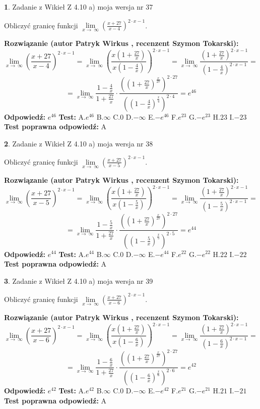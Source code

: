 \documentclass[12pt, a4paper]{article}
\theoremstyle{definition} %
\newtheorem{zad}{}
\newcommand{\zadStart}[1]{\begin{zad}#1\newline}
\newcommand{\zadStop}{\end{zad}}
\newcommand{\rozwStart}[2]{\noindent \textbf{Rozwiązanie (autor #1 , recenzent #2): }\newline}
\newcommand{\rozwStop}{\newline}
\newcommand{\odpStart}{\noindent \textbf{Odpowiedź:}\newline}
\newcommand{\odpStop}{\newline}
\newcommand{\testStart}{\noindent \textbf{Test:}\newline}
\newcommand{\testStop}{\newline}
\newcommand{\kluczStart}{\noindent \textbf{Test poprawna odpowiedź:}\newline}
\newcommand{\kluczStop}{\newline}
\begin{document}
\zadStart{Zadanie z Wikieł Z 4.10 a) moja wersja nr 37}

Obliczyć granicę funkcji  $\lim\limits_{x\to\ \infty}(\frac{x+27}{x-4})^{2\cdot x-1}$.
\zadStop
\rozwStart{Patryk Wirkus}{Szymon Tokarski}
$$\lim\limits_{x\to\ \infty}(\frac{x+27}{x-4})^{2\cdot x-1} = \lim\limits_{x\to\ \infty}(\frac{x(1+\frac{27}{x})}{x(1-\frac{4}{x})})^{2\cdot x-1}=\lim\limits_{x\to\ \infty}\frac{(1+\frac{27}{x})^{2\cdot x-1}}{(1-\frac{4}{x})^{2\cdot x-1}}=$$
$$=\lim\limits_{x\to\ \infty}\frac{1-\frac{4}{x}}{1+\frac{27}{x}}\cdot\frac{((1+\frac{27}{x})^{\frac{x}{27}})^{2\cdot27}}{((1-\frac{4}{x})^{\frac{x}{4}})^{2\cdot4}}=e^{46}$$
\rozwStop
\odpStart
$e^{46}$
\odpStop
\testStart
A.$e^{46}$ B.$\infty$ C.$0$ D.$-\infty$ E.$-e^{46}$
F.$e^{23}$ G.$-e^{23}$
H.$23$
I.$-23$
\testStop
\kluczStart
A
\kluczStop



\zadStart{Zadanie z Wikieł Z 4.10 a) moja wersja nr 38}

Obliczyć granicę funkcji  $\lim\limits_{x\to\ \infty}(\frac{x+27}{x-5})^{2\cdot x-1}$.
\zadStop
\rozwStart{Patryk Wirkus}{Szymon Tokarski}
$$\lim\limits_{x\to\ \infty}(\frac{x+27}{x-5})^{2\cdot x-1} = \lim\limits_{x\to\ \infty}(\frac{x(1+\frac{27}{x})}{x(1-\frac{5}{x})})^{2\cdot x-1}=\lim\limits_{x\to\ \infty}\frac{(1+\frac{27}{x})^{2\cdot x-1}}{(1-\frac{5}{x})^{2\cdot x-1}}=$$
$$=\lim\limits_{x\to\ \infty}\frac{1-\frac{5}{x}}{1+\frac{27}{x}}\cdot\frac{((1+\frac{27}{x})^{\frac{x}{27}})^{2\cdot27}}{((1-\frac{5}{x})^{\frac{x}{5}})^{2\cdot5}}=e^{44}$$
\rozwStop
\odpStart
$e^{44}$
\odpStop
\testStart
A.$e^{44}$ B.$\infty$ C.$0$ D.$-\infty$ E.$-e^{44}$
F.$e^{22}$ G.$-e^{22}$
H.$22$
I.$-22$
\testStop
\kluczStart
A
\kluczStop



\zadStart{Zadanie z Wikieł Z 4.10 a) moja wersja nr 39}

Obliczyć granicę funkcji  $\lim\limits_{x\to\ \infty}(\frac{x+27}{x-6})^{2\cdot x-1}$.
\zadStop
\rozwStart{Patryk Wirkus}{Szymon Tokarski}
$$\lim\limits_{x\to\ \infty}(\frac{x+27}{x-6})^{2\cdot x-1} = \lim\limits_{x\to\ \infty}(\frac{x(1+\frac{27}{x})}{x(1-\frac{6}{x})})^{2\cdot x-1}=\lim\limits_{x\to\ \infty}\frac{(1+\frac{27}{x})^{2\cdot x-1}}{(1-\frac{6}{x})^{2\cdot x-1}}=$$
$$=\lim\limits_{x\to\ \infty}\frac{1-\frac{6}{x}}{1+\frac{27}{x}}\cdot\frac{((1+\frac{27}{x})^{\frac{x}{27}})^{2\cdot27}}{((1-\frac{6}{x})^{\frac{x}{6}})^{2\cdot6}}=e^{42}$$
\rozwStop
\odpStart
$e^{42}$
\odpStop
\testStart
A.$e^{42}$ B.$\infty$ C.$0$ D.$-\infty$ E.$-e^{42}$
F.$e^{21}$ G.$-e^{21}$
H.$21$
I.$-21$
\testStop
\kluczStart
A
\kluczStop
\end{document}
